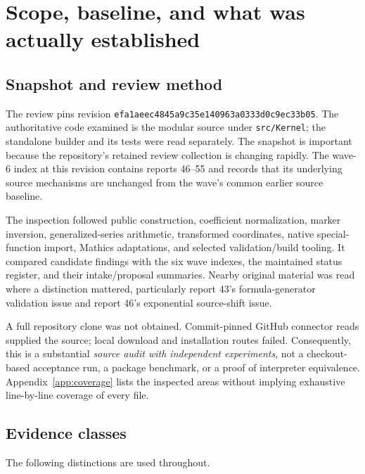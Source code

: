 \documentclass[11pt,letterpaper]{article}
\newcommand{\code}[1]{\nolinkurl{#1}}
\newcommand{\commit}{\code{efa1aeec4845a9c35e140963a0333d0c9ec33b05}}
\begin{document}
\clearpage
{\small\setlength{\parskip}{0pt}\tableofcontents}
\clearpage

\section{Scope, baseline, and what was actually established}
\label{sec:scope}

\subsection{Snapshot and review method}
The review pins revision \commit. The authoritative code examined is the modular source under \code{src/Kernel}; the standalone builder and its tests were read separately. The snapshot is important because the repository's retained review collection is changing rapidly. The wave-6 index at this revision contains reports 46--55 and records that its underlying source mechanisms are unchanged from the wave's common earlier source baseline.\cite{snapshot,wave6}

The inspection followed public construction, coefficient normalization, marker inversion, generalized-series arithmetic, transformed coordinates, native special-function import, Mathics adaptations, and selected validation/build tooling. It compared candidate findings with the six wave indexes, the maintained status register, and their intake/proposal summaries. Nearby original material was read where a distinction mattered, particularly report 43's formula-generator validation issue and report 46's exponential source-shift issue.\cite{register,reviewindex,wave1,wave2,wave3,wave4,wave5,wave6,report43,report46}

A full repository clone was not obtained. Commit-pinned GitHub connector reads supplied the source; local download and installation routes failed. Consequently, this is a substantial \emph{source audit with independent experiments}, not a checkout-based acceptance run, a package benchmark, or a proof of interpreter equivalence. Appendix~\ref{app:coverage} lists the inspected areas without implying exhaustive line-by-line coverage of every file.

\subsection{Evidence classes}
The following distinctions are used throughout.
\end{document}
